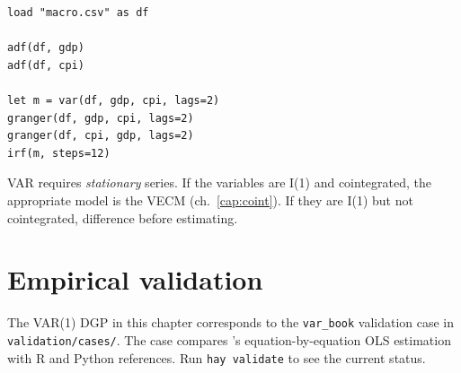 \begin{lstlisting}[caption={Typical workflow --- GDP and inflation}]
load "macro.csv" as df

adf(df, gdp)
adf(df, cpi)

let m = var(df, gdp, cpi, lags=2)
granger(df, gdp, cpi, lags=2)
granger(df, cpi, gdp, lags=2)
irf(m, steps=12)
\end{lstlisting}

\begin{nota}
  VAR requires \emph{stationary} series. If the variables are I(1) and
  cointegrated, the appropriate model is the VECM (ch.~\ref{cap:coint}). If
  they are I(1) but not cointegrated, difference before estimating.
\end{nota}

\section{Empirical validation}

The VAR(1) DGP in this chapter corresponds to the \texttt{var\_book}
validation case in \texttt{validation/cases/}. The case compares
\hayashi{}'s equation-by-equation OLS estimation with R and Python
references. Run \lstinline{hay validate} to see the current status.
